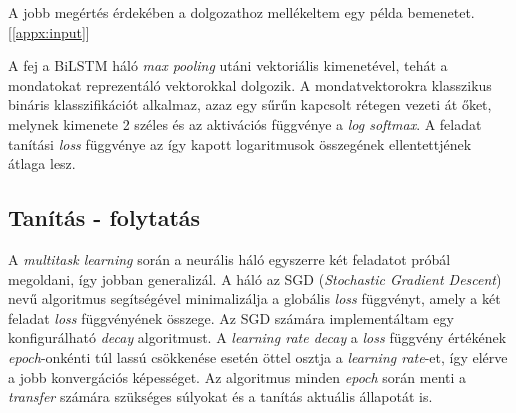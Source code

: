 \begin{note}
	A jobb megértés érdekében a dolgozathoz mellékeltem egy példa bemenetet. [\ref{appx:input}]
\end{note}

A fej a BiLSTM háló \textit{max pooling} utáni vektoriális kimenetével, tehát a mondatokat reprezentáló vektorokkal dolgozik. A mondatvektorokra klasszikus bináris klasszifikációt alkalmaz, azaz egy sűrűn kapcsolt rétegen vezeti át őket, melynek kimenete 2 széles és az aktivációs függvénye a \textit{log softmax}. A feladat tanítási \textit{loss} függvénye az így kapott logaritmusok összegének ellentettjének átlaga lesz.

\subsection*{Tanítás - folytatás}
A \textit{multitask learning} során a neurális háló egyszerre két feladatot próbál megoldani, így jobban generalizál. A háló az SGD (\textit{Stochastic Gradient Descent}) nevű algoritmus segítségével minimalizálja a globális \textit{loss} függvényt, amely a két feladat \textit{loss} függvényének összege.
Az SGD számára implementáltam egy konfigurálható \textit{decay} algoritmust. A \textit{learning rate decay} a \textit{loss} függvény értékének \textit{epoch}-onkénti túl lassú csökkenése esetén öttel osztja a \textit{learning rate}-et, így elérve a jobb konvergációs képességet. Az algoritmus minden \textit{epoch} során menti a \textit{transfer} számára szükséges súlyokat és a tanítás aktuális állapotát is.

